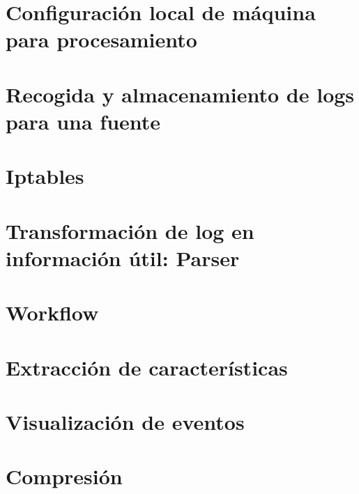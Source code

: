 \section{Configuración local de máquina para procesamiento}

\section{Recogida y almacenamiento de logs para una fuente}

\section{Iptables}

\section{Transformación de log en información útil: Parser}

\section{Workflow}

\section{Extracción de características}

\section{Visualización de eventos}

\section{Compresión}
